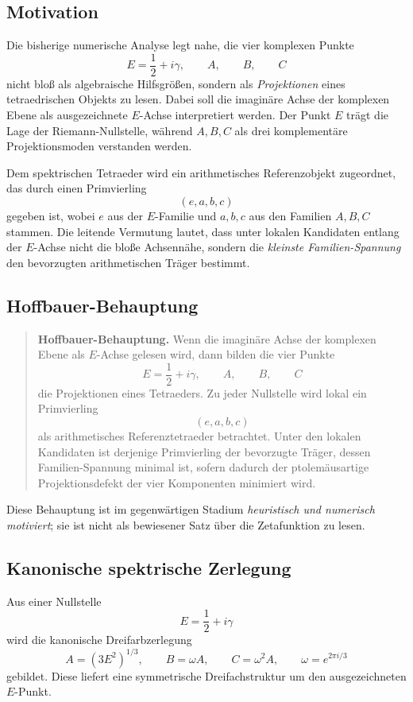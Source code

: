 \documentclass[11pt,a4paper]{article}
\theoremstyle{definition}
\begin{document}
\subsection{Motivation}

Die bisherige numerische Analyse legt nahe, die vier komplexen Punkte
\[
E=\frac12+i\gamma,\qquad A,\qquad B,\qquad C
\]
nicht bloß als algebraische Hilfsgrößen, sondern als \emph{Projektionen} eines tetraedrischen Objekts zu lesen. Dabei soll die imaginäre Achse der komplexen Ebene als ausgezeichnete \(E\)-Achse interpretiert werden. Der Punkt \(E\) trägt die Lage der Riemann-Nullstelle, während \(A,B,C\) als drei komplementäre Projektionsmoden verstanden werden.

Dem spektrischen Tetraeder wird ein arithmetisches Referenzobjekt zugeordnet, das durch einen Primvierling
\[
(e,a,b,c)
\]
gegeben ist, wobei \(e\) aus der \(E\)-Familie und \(a,b,c\) aus den Familien \(A,B,C\) stammen. Die leitende Vermutung lautet, dass unter lokalen Kandidaten entlang der \(E\)-Achse nicht die bloße Achsennähe, sondern die \emph{kleinste Familien-Spannung} den bevorzugten arithmetischen Träger bestimmt.

\subsection{Hoffbauer-Behauptung}

\begin{quote}
	\textbf{Hoffbauer-Behauptung.}
	Wenn die imaginäre Achse der komplexen Ebene als \(E\)-Achse gelesen wird, dann bilden die vier Punkte
	\[
	E=\frac12+i\gamma,\qquad A,\qquad B,\qquad C
	\]
	die Projektionen eines Tetraeders. Zu jeder Nullstelle wird lokal ein Primvierling
	\[
	(e,a,b,c)
	\]
	als arithmetisches Referenztetraeder betrachtet. Unter den lokalen Kandidaten ist derjenige Primvierling der bevorzugte Träger, dessen Familien-Spannung minimal ist, sofern dadurch der ptolemäusartige Projektionsdefekt der vier Komponenten minimiert wird.
\end{quote}

Diese Behauptung ist im gegenwärtigen Stadium \emph{heuristisch und numerisch motiviert}; sie ist nicht als bewiesener Satz über die Zetafunktion zu lesen.

\subsection{Kanonische spektrische Zerlegung}

Aus einer Nullstelle
\[
E=\frac12+i\gamma
\]
wird die kanonische Dreifarbzerlegung
\[
A=(3E^2)^{1/3},\qquad
B=\omega A,\qquad
C=\omega^2A,
\qquad \omega=e^{2\pi i/3}
\]
gebildet. Diese liefert eine symmetrische Dreifachstruktur um den ausgezeichneten \(E\)-Punkt.
\end{document}

